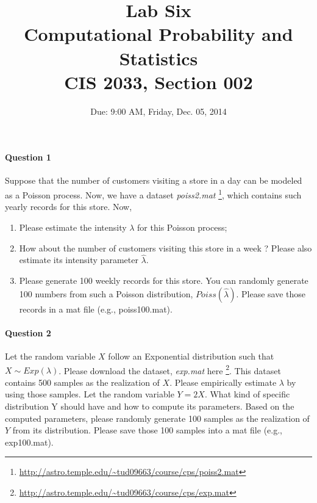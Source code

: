 \documentclass[11pt]{article} %
\title{Lab Six\\
Computational Probability and Statistics \\
CIS 2033, Section 002}
\author{Due: 9:00 AM, Friday, Dec. 05, 2014}
\date{} %
\begin{document}
\maketitle

\paragraph*{Question 1}
Suppose that the number of customers visiting a store in a day can be modeled as a Poisson process. Now, we have a dataset {\it poiss2.mat} \footnote{\url{http://astro.temple.edu/~tud09663/course/cps/poiss2.mat}}, which contains such yearly records for this store. Now, 
\begin{enumerate}
\item Please estimate the intensity $\lambda$ for this Poisson process;
\item How about the number of customers visiting this store in a week ? Please also estimate its intensity parameter $\hat{\lambda}$. 
\item Please generate 100 weekly records for this store. You can randomly generate 100 numbers from such a Poisson distribution, $Poiss(\hat{\lambda})$. Please save those records in a mat file (e.g., poiss100.mat). 
\end{enumerate}
 
\paragraph*{Question 2}
Let the random variable $X$ follow an Exponential distribution such that $X \sim Exp(\lambda)$. Please download the dataset, {\it exp.mat} here \footnote{\url{http://astro.temple.edu/~tud09663/course/cps/exp.mat}}. This dataset contains 500 samples as the realization of $X$. Please empirically estimate $\lambda$ by using those samples. Let the random variable $Y = 2X$. What kind of specific distribution Y should have and how to compute its parameters. Based on the computed parameters, please randomly generate 100 samples as the realization of $Y$ from its distribution.  Please save those 100 samples into a mat file (e.g., exp100.mat). 
\end{document}
